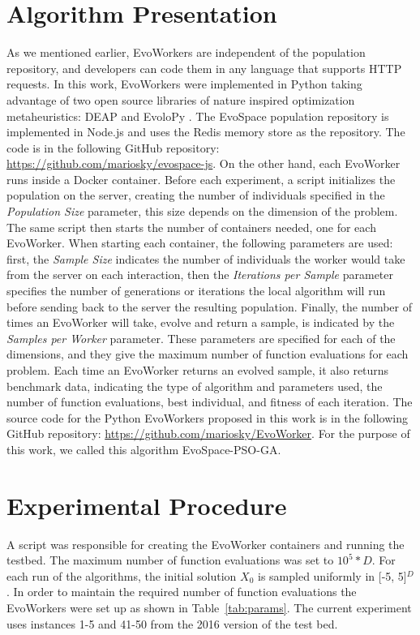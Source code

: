 \documentclass[sigconf]{acmart}
\begin{document}
\section{Algorithm Presentation}

As we mentioned earlier, EvoWorkers are independent of  the population
repository, and developers can code them  in any language that supports HTTP
requests. In this work,   EvoWorkers were implemented in Python taking
advantage of  two open source libraries of nature inspired optimization
metaheuristics:  DEAP \cite{fortin2012deap} and EvoloPy
\cite{faris2016evolopy}. The EvoSpace population repository is implemented in
Node.js and uses the Redis memory store as the repository. The code is in the
following GitHub repository: \url{https://github.com/mariosky/evospace-js}. 
On the other hand, each EvoWorker runs inside a Docker container. Before each
experiment, a script initializes the population on the server, creating the
number of individuals specified in the {\em Population Size} parameter, this size
depends on the dimension of the problem.  The same script then starts the
number of containers needed, one for each EvoWorker. When starting each
container, the following parameters are used: first, the {\em Sample Size}
indicates the number of individuals the worker would take from the server on each
interaction, then the {\em Iterations per Sample} parameter specifies the number of
generations or iterations the local algorithm will run before sending back to
the server the resulting population. Finally, the number of times an 
EvoWorker will take, evolve and return a sample, is 
indicated by the {\em Samples per Worker} parameter. These
parameters are specified for each of the dimensions, and they give the maximum
number of function evaluations for each problem. Each time an EvoWorker 
returns an evolved sample, it also returns benchmark data, indicating the type
of algorithm and parameters used, the number of function evaluations, 
best individual, and fitness of each iteration. The source code for the Python 
EvoWorkers proposed in this work is in the following GitHub repository:
\url{https://github.com/mariosky/EvoWorker}. 
For the purpose of this work, we called this algorithm EvoSpace-PSO-GA.   


% 
\section{Experimental Procedure} 
A script was responsible for creating the
EvoWorker  containers and running the testbed. The maximum number of  function
evaluations was set to $10^5*D$. For each run  of the algorithms, the initial
solution $X_0$ is sampled uniformly in [-5, 5]$^D$. In order to maintain the
required number of function  evaluations the EvoWorkers were set up as
shown in Table~\ref{tab:params}. The current experiment uses instances 1-5 and 41-50
from the 2016 version of the test bed. 
\end{document}
